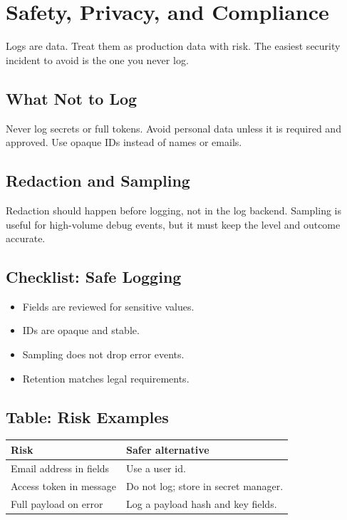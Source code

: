 \chapter{Safety, Privacy, and Compliance}
Logs are data. Treat them as production data with risk. The easiest security incident to avoid is the one you never log.

\section{What Not to Log}
Never log secrets or full tokens. Avoid personal data unless it is required and approved. Use opaque IDs instead of names or emails.

\section{Redaction and Sampling}
Redaction should happen before logging, not in the log backend. Sampling is useful for high-volume debug events, but it must keep the level and outcome accurate.

\section{Checklist: Safe Logging}
\begin{itemize}
\item Fields are reviewed for sensitive values.
\item IDs are opaque and stable.
\item Sampling does not drop error events.
\item Retention matches legal requirements.
\end{itemize}

\section{Table: Risk Examples}
\begin{table}[h]
\centering
\begin{tabularx}{\textwidth}{lX}
\toprule
Risk & Safer alternative \\
\midrule
Email address in fields & Use a user id. \\
Access token in message & Do not log; store in secret manager. \\
Full payload on error & Log a payload hash and key fields. \\
\bottomrule
\end{tabularx}
\end{table}

